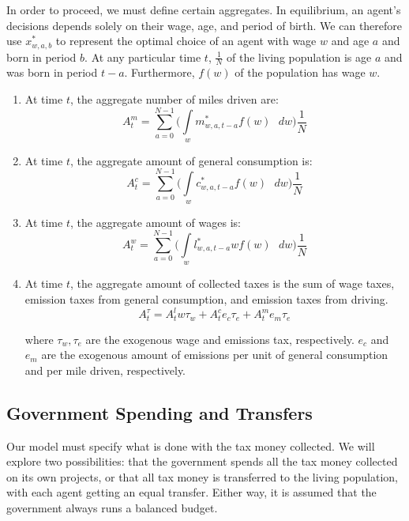 \documentclass[letter, 12pt, epsf,leqno]{article}
\begin{document}
In order to proceed, we must define certain aggregates.  In equilibrium, an agent's decisions depends solely on their wage, age, and period of birth.  We can therefore use $x^*_{w, a, b}$ to represent the optimal choice of an agent with wage $w$ and age $a$ and born in period $b$.  At any particular time $t$, $ \frac{1}{N}$ of the living population is age $a$ and was born in period $t-a$.  Furthermore, $f(w)$ of the population has wage $w$.  
\begin{enumerate}
\item At time $t$, the aggregate number of miles driven are:
\begin{equation}
A^m_t = \sum_{a=0}^{N-1} \Bigg( \int\limits_w m_{w,a,t-a}^* f(w) \text{ } dw \Bigg) \frac{1}{N}\label{eq:Ad}
\end{equation}
\item At time $t$, the aggregate amount of general consumption is:
\begin{equation}
A^c_t = \sum_{a=0}^{N-1} \Bigg( \int\limits_w c_{w,a,t-a}^* f(w) \text{ } dw \Bigg) \frac{1}{N}\label{eq:Ac}
\end{equation}
\item At time $t$, the aggregate amount of wages is:
\begin{equation}
A^w_t = \sum_{a=0}^{N-1} \Bigg( \int\limits_w l_{w,a,t-a}^*w f(w) \text{ } dw \Bigg) \frac{1}{N}\label{eq:Aw}
\end{equation}
\item At time $t$, the aggregate amount of collected taxes is the sum of wage taxes, emission taxes from general consumption, and emission taxes from driving.
\begin{equation}
A^\tau_t = A^l_t  w \tau_w + A^c_t  e_c \tau_e  + A^m_t  e_m \tau_e\label{eq:As}
\end{equation}

where $\tau_w, \tau_e$ are the exogenous wage and emissions tax, respectively.  $e_c$ and $e_m$ are the exogenous amount of emissions per unit of general consumption and per mile driven, respectively.
\end{enumerate}%

\subsection{Government Spending and Transfers}

Our model must specify what is done with the tax money collected.  We will explore two possibilities: that the government spends all the tax money collected on its own projects, or that all tax money is transferred to the living population, with each agent getting an equal transfer.  Either way, it is assumed that the government always runs a balanced budget.
\end{document}
